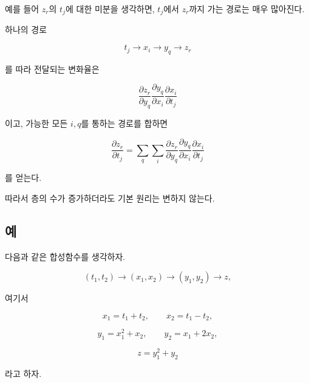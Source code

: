 \documentclass[11pt,a4paper]{article}
\begin{document}
예를 들어 $z_r$의 $t_j$에 대한 미분을 생각하면,
$t_j$에서 $z_r$까지 가는 경로는 매우 많아진다.

하나의 경로

\[
t_j
\longrightarrow
x_i
\longrightarrow
y_q
\longrightarrow
z_r
\]

를 따라 전달되는 변화율은

\[
\frac{\partial z_r}{\partial y_q}
\frac{\partial y_q}{\partial x_i}
\frac{\partial x_i}{\partial t_j}
\]

이고, 가능한 모든 $i,q$를 통하는 경로를 합하면

\[
\boxed{
\frac{\partial z_r}{\partial t_j}
=
\sum_{q}
\sum_{i}
\frac{\partial z_r}{\partial y_q}
\frac{\partial y_q}{\partial x_i}
\frac{\partial x_i}{\partial t_j}
}
\]

를 얻는다.

따라서 층의 수가 증가하더라도 기본 원리는 변하지 않는다.

\subsection*{예}

다음과 같은 합성함수를 생각하자.

\[
(t_1,t_2)
\longrightarrow
(x_1,x_2)
\longrightarrow
(y_1,y_2)
\longrightarrow
z,
\]

여기서

\[
x_1=t_1+t_2,\qquad
x_2=t_1-t_2,
\]

\[
y_1=x_1^2+x_2,\qquad
y_2=x_1+2x_2,
\]

\[
z=y_1^2+y_2
\]

라고 하자.

\begin{center}
\end{center}
\end{document}
